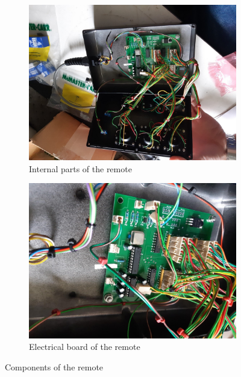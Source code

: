 \documentclass[12pt, a4paper]{article}
\begin{document}
\begin{figure}[h]
	
	\begin{subfigure}[t]{0.5\textwidth}
		\centering
		\includegraphics[width=\textwidth]{remote_internal} 
		\caption{Internal parts of the remote}
		\label{fig:remote_in}
	\end{subfigure}
	
	\begin{subfigure}[t]{0.5\textwidth}
		\centering
		\includegraphics[width=\textwidth]{remote_board}
		\caption{Electrical board of the remote}
		\label{fig:remote_board}
	\end{subfigure}
 
	\caption{Components of the remote}
	\label{fig:remote_comp}
\end{figure}
\end{document}
